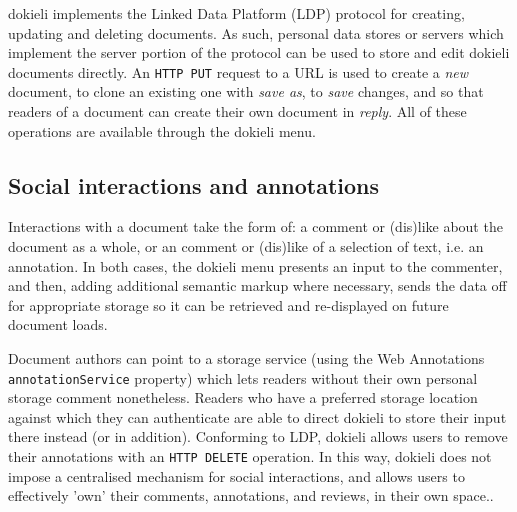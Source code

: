 \documentclass[a4paper]{llncs}
\begin{document}
                                    
\par dokieli implements the \empty Linked Data Platform (LDP) protocol for creating, updating and deleting documents. As such, personal data stores or servers which implement the server portion of the protocol can be used to store and edit dokieli documents directly. An {\tt HTTP PUT} request to a URL is used to create a {\em new} document, to clone an existing one with {\em save as}, to {\em save} changes, and so that readers of a document can create their own document in {\em reply}. All of these operations are available through the dokieli menu.
                                
                            

                            
                                \subsection{Social interactions and annotations}
  \label{social-interactions-and-annotations}

                                
                                    
\par Interactions with a document take the form of: a comment or (dis)like about the document as a whole, or an comment or (dis)like of a selection of text, i.e. an annotation. In both cases, the dokieli menu presents an input to the commenter, and then, adding additional semantic markup where necessary, sends the data off for appropriate storage so it can be retrieved and re-displayed on future document loads.

                                    
\par Document authors can point to a storage service (using the Web Annotations {\tt annotationService} property) which lets readers without their own personal storage comment nonetheless. Readers who have a preferred storage location against which they can authenticate are able to direct dokieli to store their input there instead (or in addition). Conforming to LDP, dokieli allows users to remove their annotations with an {\tt HTTP DELETE} operation. In this way, dokieli does not impose a centralised mechanism for social interactions, and allows users to effectively 'own' their comments, annotations, and reviews, in their own space..

                                    
                                
\end{document}

